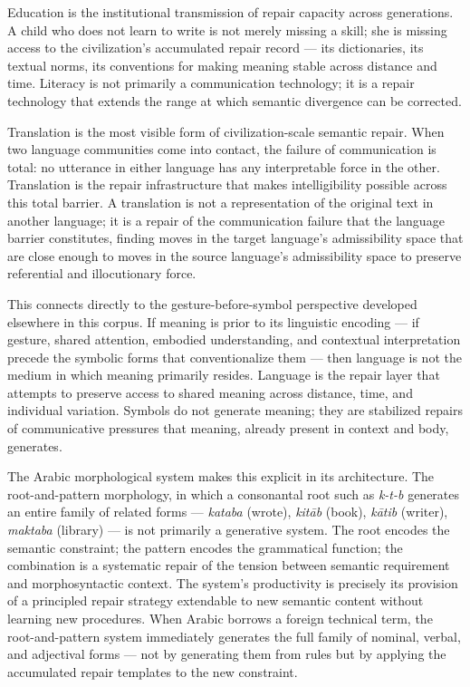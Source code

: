 \documentclass[11pt, a4paper]{article}
\theoremstyle{definition}
\theoremstyle{remark}
\begin{document}
Education is the institutional transmission of repair capacity across
generations. A child who does not learn to write is not merely missing a skill;
she is missing access to the civilization's accumulated repair record --- its
dictionaries, its textual norms, its conventions for making meaning stable
across distance and time. Literacy is not primarily a communication technology;
it is a repair technology that extends the range at which semantic divergence
can be corrected.

Translation is the most visible form of civilization-scale semantic repair.
When two language communities come into contact, the failure of communication
is total: no utterance in either language has any interpretable force in the
other. Translation is the repair infrastructure that makes intelligibility
possible across this total barrier. A translation is not a representation of
the original text in another language; it is a repair of the communication
failure that the language barrier constitutes, finding moves in the target
language's admissibility space that are close enough to moves in the source
language's admissibility space to preserve referential and illocutionary force.

This connects directly to the gesture-before-symbol perspective developed
elsewhere in this corpus. If meaning is prior to its linguistic encoding ---
if gesture, shared attention, embodied understanding, and contextual
interpretation precede the symbolic forms that conventionalize them ---
then language is not the medium in which meaning primarily resides. Language
is the repair layer that attempts to preserve access to shared meaning across
distance, time, and individual variation. Symbols do not generate meaning; they
are stabilized repairs of communicative pressures that meaning, already present
in context and body, generates.

The Arabic morphological system makes this explicit in its architecture. The
root-and-pattern morphology, in which a consonantal root such as
\textit{k-t-b} generates an entire family of related forms --- \textit{kataba}
(wrote), \textit{kit\={a}b} (book), \textit{k\={a}tib} (writer),
\textit{maktaba} (library) --- is not primarily a generative system. The root
encodes the semantic constraint; the pattern encodes the grammatical function;
the combination is a systematic repair of the tension between semantic
requirement and morphosyntactic context. The system's productivity is precisely
its provision of a principled repair strategy extendable to new semantic content
without learning new procedures. When Arabic borrows a foreign technical term,
the root-and-pattern system immediately generates the full family of nominal,
verbal, and adjectival forms --- not by generating them from rules but by
applying the accumulated repair templates to the new constraint.
\end{document}
